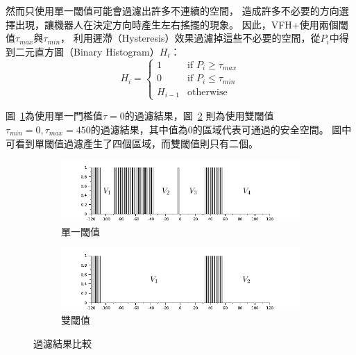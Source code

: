 然而只使用單一閾值可能會過濾出許多不連續的空間，
造成許多不必要的方向選擇出現，讓機器人在決定方向時產生左右搖擺的現象。
因此，VFH+使用兩個閾值$\tau_{max}$與$\tau_{min}$，
利用遲滯（Hysteresis）效果過濾掉這些不必要的空間，從$P_i$中得到二元直方圖（Binary Histogram）$H_i$：
\begin{equation}
	H_i = 
	\begin{cases}
		1	& \textrm{if } P_i \geq \tau_{max} \\
		0	& \textrm{if } P_i \leq \tau_{min} \\
		H_{i-1}	& \textrm{otherwise}
	\end{cases}
\end{equation} 

圖~\ref{f:binary_histogram_1}為使用單一門檻值$\tau=0$的過濾結果，圖~\ref{f:binary_histogram_2}
則為使用雙閾值$\tau_{min}=0,\tau_{max}=450$的過濾結果，其中值為$0$的區域代表可通過的安全空間。
圖中可看到單閾值過濾產生了四個區域，而雙閾值則只有二個。
\begin{figure}[h!]
	\centering
	\begin{subfigure}[b]{0.8\textwidth}
		\includegraphics[width=\textwidth]{figures/algorithm/binary_histogram_1}
		\caption{單一閾值}
		\label{f:binary_histogram_1}
	\end{subfigure}
	\begin{subfigure}[b]{0.8\textwidth}
		\includegraphics[width=\textwidth]{figures/algorithm/binary_histogram_2}
		\caption{雙閾值}
		\label{f:binary_histogram_2}
	\end{subfigure}
	\caption{過濾結果比較}
	\label{f:binary_histogram}
\end{figure}

